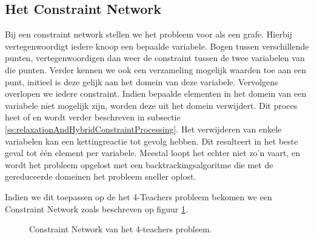 \subsection{Het Constraint Network}
Bij een constraint network stellen we het probleem voor als een grafe. Hierbij vertegenwoordigt iedere knoop een bepaalde variabele. Bogen tussen verschillende punten, vertegenwoordigen dan weer de constraint tussen de twee variabelen van die punten. Verder kennen we ook een verzameling mogelijk waarden toe aan een punt, initieel is deze gelijk aan het domein van deze variabele. Vervolgens overlopen we iedere constraint. Indien bepaalde elementen in het domein van een variabele niet mogelijk zijn, worden deze uit het domein verwijdert. Dit proces heet  of  en wordt verder beschreven in subsectie \ref{ss:relaxationAndHybridConstraintProcessing}. Het verwijderen van enkele variabelen kan een kettingreactie tot gevolg hebben. Dit resulteert in het beste geval tot \'e\'en element per variabele. Meestal loopt het echter niet zo'n vaart, en wordt het probleem opgelost met een backtrackingsalgoritme die met de gereduceerde domeinen het probleem sneller oplost.
\begin{leftbar}
Indien we dit toepassen op de het 4-Teachers probleem bekomen we een Constraint Network zoals beschreven op figuur \ref{fig:fourTeachersConstraintNetwork}.
\end{leftbar}
\begin{figure}[htb]
\centering
{}
\caption{Constraint Network van het 4-teachers probleem.}
\label{fig:fourTeachersConstraintNetwork}
\end{figure}
